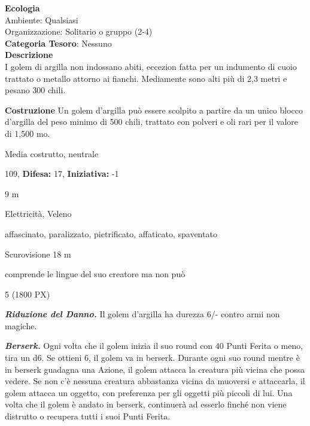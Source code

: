 \begin{multicols}{2}
{\textbf{Ecologia}\\
Ambiente: Qualsiasi\\
Organizzazione: Solitario o gruppo (2-4)\\
\textbf{Categoria Tesoro}: Nessuno\\
\textbf{Descrizione}\\
I golem di argilla non indossano abiti, eccezion fatta per un indumento di cuoio trattato o metallo attorno ai fianchi. Mediamente sono alti più di 2,3 metri e pesano 300 chili.

\textbf{Costruzione}
Un golem d'argilla può essere scolpito a partire da un unico blocco d'argilla del peso minimo di 500 chili, trattato con polveri e oli rari per il valore di 1,500 mo.

\noindent
\begin{description}[noitemsep, topsep=0pt, parsep=0pt, partopsep=0pt, leftmargin=0cm, labelwidth=2.2cm]
	\item[\textbf{Taglia/Tipo:}] Media costrutto, neutrale
	\item[\textbf{Caratt.:}] 
	\item[\textbf{Punti Ferita:}] 109,  \textbf{Difesa:} 17,  \textbf{Iniziativa:} -1
	\item[\textbf{Movimento:}] 9 m
	\item[\textbf{Tiri Salvez.:}] 
	\item[\textbf{Imm. Danni:}] Elettricità, Veleno
	\item[\textbf{Immunità:}] affascinato, paralizzato, pietrificato, affaticato, spaventato
	\item[\textbf{Sensi:}] Scurovisione 18 m
	\item[\textbf{Linguaggi:}] comprende le lingue del suo creatore ma non può
	\item[\textbf{Sfida:}] 5 (1800 PX)\smallskip
\end{description}

\emph{\textbf{Riduzione del Danno.}} Il golem d'argilla ha durezza 6/- contro armi non magiche.

\emph{\textbf{Berserk.}} Ogni volta che il golem inizia il suo round con 40 Punti Ferita o meno, tira un d6. Se ottieni 6, il golem va in berserk. Durante ogni suo round mentre è in berserk guadagna una Azione, il golem attacca la creatura più vicina che possa vedere. Se non c'è nessuna creatura abbastanza vicina da muoversi e attaccarla, il golem attacca un oggetto, con preferenza per gli oggetti più piccoli di lui. Una volta che il golem è andato in berserk, continuerà ad esserlo finché non viene distrutto o recupera tutti i suoi Punti Ferita.

}
\end{multicols}
